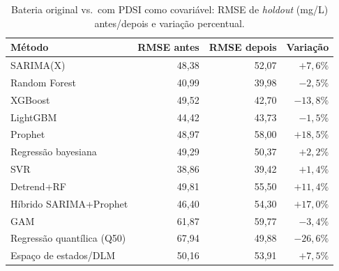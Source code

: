 \begin{table}[H]
\centering
\caption{Bateria original vs.\ com PDSI como covariável: RMSE de \textit{holdout} (mg/L) antes/depois e variação percentual.}
\label{tab:pdsi-antes-depois}
\begin{tabular}{lrrr}
\hline
Método & RMSE antes & RMSE depois & Variação \\
\hline
SARIMA(X) & 48,38 & 52,07 & $+7{,}6\%$ \\
Random Forest & 40,99 & 39,98 & $-2{,}5\%$ \\
XGBoost & 49,52 & 42,70 & $-13{,}8\%$ \\
LightGBM & 44,42 & 43,73 & $-1{,}5\%$ \\
Prophet & 48,97 & 58,00 & $+18{,}5\%$ \\
Regressão bayesiana & 49,29 & 50,37 & $+2{,}2\%$ \\
SVR & 38,86 & 39,42 & $+1{,}4\%$ \\
Detrend+RF & 49,81 & 55,50 & $+11{,}4\%$ \\
Híbrido SARIMA+Prophet & 46,40 & 54,30 & $+17{,}0\%$ \\
GAM & 61,87 & 59,77 & $-3{,}4\%$ \\
Regressão quantílica (Q50) & 67,94 & 49,88 & $-26{,}6\%$ \\
Espaço de estados/DLM & 50,16 & 53,91 & $+7{,}5\%$ \\
\hline
\end{tabular}
\end{table}

